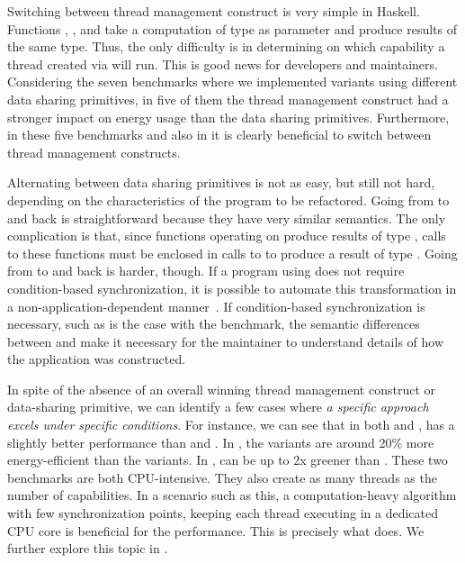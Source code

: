 Switching between thread management construct is very simple in Haskell. Functions \forkOn, \forkIO, and \forkOS take a computation of type \IO as parameter and produce results of the same type. Thus, the only difficulty is in determining on which capability a thread created via \forkOn will run. This is good news for developers and maintainers. Considering the seven benchmarks where we implemented variants using different data sharing primitives, in five of them the thread management construct had a stronger impact on energy usage than the data sharing primitives. Furthermore, in these five benchmarks and also in \warp it is clearly beneficial to switch between thread management constructs.

Alternating between data sharing primitives is not as easy, but still not hard, depending on the characteristics of the program to be refactored. Going from \MVar to \TMVar and back is straightforward because they have very similar semantics. The only complication is that, since functions operating on \TMVar produce results of type \STM, calls to these functions must be enclosed in calls to \atomically to produce a result of type \IO. Going from \MVar to \TVar and back is harder, though. If a program using \MVar does not require condition-based synchronization, it is possible to automate this transformation in a non-application-dependent manner~\cite{soares-neto:2014}. If condition-based synchronization is necessary, such as is the case with the \dining benchmark, the semantic differences between \TVar and \MVar make it necessary for the maintainer to understand details of how the application was constructed.

In spite of the absence of an overall winning thread management construct or data-sharing primitive, we can identify a few cases where \emph{a specific approach excels under specific conditions}. For instance, we can see that in both \mandelbrot and \spectral, \forkOn has a slightly better performance than \forkIO and \forkOS. In \mandelbrot, the \forkOn variants are around 20\% more energy-efficient than the \forkIO variants. In \spectral, \forkOn can be up to 2x greener than \forkOS. These two benchmarks are both CPU-intensive. They also create as many threads as the number of capabilities. In a scenario such as this, a computation-heavy algorithm with few synchronization points, keeping each thread executing in a dedicated CPU core is beneficial for the performance. This is precisely what \forkOn does. We further explore this topic in .

